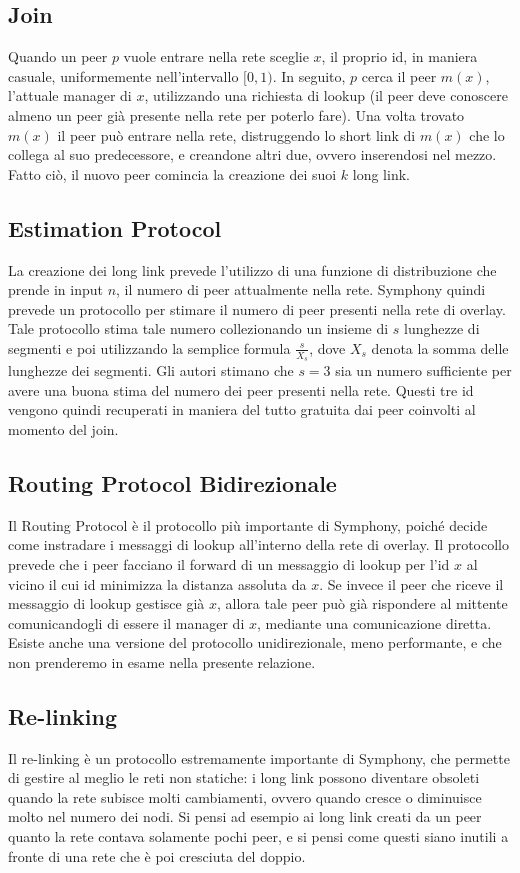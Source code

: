 \documentclass[prodmode,acmtap]{acmlarge}
\begin{document}
\subsection{Join}
Quando un peer $p$ vuole entrare nella rete sceglie $x$, il proprio id, in maniera casuale, uniformemente nell'intervallo $[0,1)$. In seguito, $p$ cerca il peer $m(x)$, l'attuale manager di $x$, utilizzando una richiesta di lookup (il peer deve conoscere almeno un peer già presente nella rete per poterlo fare). Una volta trovato $m(x)$ il peer può entrare nella rete, distruggendo lo short link di $m(x)$ che lo collega al suo predecessore, e creandone altri due, ovvero inserendosi nel mezzo. Fatto ciò, il nuovo peer comincia la creazione dei suoi $k$ long link.


\subsection{Estimation Protocol}
La creazione dei long link prevede l'utilizzo di una funzione di distribuzione che prende in input $n$, il numero di peer attualmente nella rete. Symphony quindi prevede un protocollo per stimare il numero di peer presenti nella rete di overlay. Tale protocollo stima tale numero collezionando un insieme di $s$ lunghezze di segmenti e poi utilizzando la semplice formula $\frac{s}{X_s}$, dove $X_s$ denota la somma delle lunghezze dei segmenti. Gli autori stimano che $s = 3$ sia un numero sufficiente per avere una buona stima del numero dei peer presenti nella rete. Questi tre id vengono quindi recuperati in maniera del tutto gratuita dai peer coinvolti al momento del join. 

\subsection{Routing Protocol Bidirezionale}
Il Routing Protocol è il protocollo più importante di Symphony, poiché decide come instradare i messaggi di lookup all'interno della rete di overlay. Il protocollo prevede che i peer facciano il forward di un messaggio di lookup per l'id $x$ al vicino il cui id minimizza la distanza assoluta da $x$. Se invece il peer che riceve il messaggio di lookup gestisce già $x$, allora tale peer può già rispondere al mittente comunicandogli di essere il manager di $x$, mediante una comunicazione diretta. Esiste anche una versione del protocollo unidirezionale, meno performante, e che non prenderemo in esame nella presente relazione.

\subsection{Re-linking}
Il re-linking è un protocollo estremamente importante di Symphony, che permette di gestire al meglio le reti non statiche: i long link possono diventare obsoleti quando la rete subisce molti cambiamenti, ovvero quando cresce o diminuisce molto nel numero dei nodi. Si pensi ad esempio ai long link creati da un peer quanto la rete contava solamente pochi peer, e si pensi come questi siano inutili a fronte di una rete che è poi cresciuta del doppio. 
\end{document}
